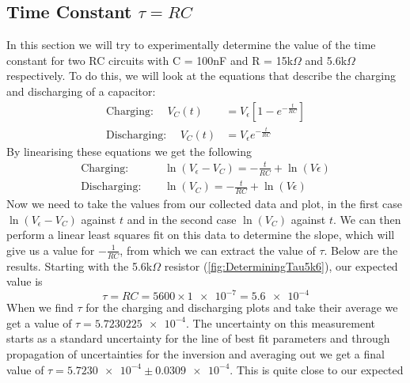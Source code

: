 \documentclass[12pt]{article}
\numberwithin{equation}{section}
\numberwithin{figure}{section}
\begin{document}
    \subsection{Time Constant \texorpdfstring{$\tau=RC$}{t=RC}}
    In this section we will try to experimentally determine the value of the time constant for two RC circuits 
    with C = 100nF and R = 15k$\Omega$ and 5.6k$\Omega$ respectively. To do this, we will look at the equations 
    that describe the charging and discharging of a capacitor:
    \begin{align}
        \text{Charging:}\hspace{15pt} V_C(t)&=V_\epsilon[1-e^{-\frac{t}{RC}}] \label{eqn:CapCharging}\\
        \text{Discharging:}\hspace{15pt} V_C(t)&=V_\epsilon e^{-\frac{t}{RC}} \label{eqn:CapDischarging}
    \end{align}
    By linearising these equations we get the following
    \begin{align}
        \text{Charging:}\hspace{15pt} &\ln(V_\epsilon-V_C)=-\frac{t}{RC}+\ln(V\epsilon) \label{eqn:CapChargingLinearised}\\
        \text{Discharging:}\hspace{15pt} &\ln(V_C)=-\frac{t}{RC}+\ln(V\epsilon) \label{eqn:CapDischargingLinearised}
    \end{align}
    Now we need to take the values from our collected data and plot, in the first case $\ln(V_\epsilon-V_C)$ 
    against $t$ and in the second case $\ln(V_C)$ against $t$. We can then perform a linear least squares fit 
    on this data to determine the slope, which will give us a value for $-\frac{1}{RC}$, from which we can extract the
    value of $\tau$. Below are the results. \newline \newline
    Starting with the 5.6k$\Omega$ resistor (\autoref{fig:DeterminingTau5k6}), our expected value is 
    \begin{equation*}
        \tau=RC=5600\times \num{1e-7}=\num{5.6e-4}
    \end{equation*}
    When we find $\tau$ for the charging and discharging plots and take their average we get a value of 
    $\tau=\num{5.7230225e-4}$. The uncertainty on this measurement starts as a standard uncertainty for 
    the line of best fit parameters and through propagation of uncertainties for the inversion and averaging 
    out we get a final value of $\tau = \num{5.7230e-4}\pm\num{0.0309e-4}$. This is quite close to our expected 
\end{document}
